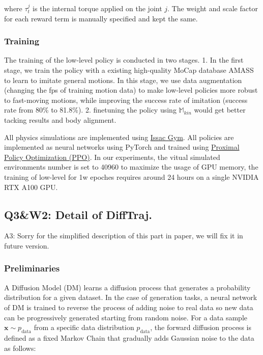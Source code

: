 \documentclass{article}
\begin{document}
where $\tau_t^{j}$ is the internal torque applied on the joint $j$. The weight and scale factor for each reward term is manually specified and kept the same.

\subsubsection{Training}\label{training}

The training of the low-level policy is conducted in two stages. 1. In the first stage, we train the policy with a existing high-quality MoCap database AMASS to learn to imitate general motions. In this stage, we use data augmentation (changing the fps of training motion data) to make low-level policies more robust to fast-moving motions, while improving the success rate of imitation (success rate from 80\% to 81.8\%). 2. finetuning the policy using $\mathbb{M}_{kin}$ would get better tacking results and body alignment.

All physics simulations are implemented using \href{https://developer.nvidia.com/isaac-gym}{Issac Gym}. All policies are implemented as neural networks using PyTorch and trained using \href{https://arxiv.org/pdf/1707.06347}{Proximal Policy Optimization (PPO)}. In our experiments, the vitual simulated environments number is set to 40960 to maximize the usage of GPU memory, the training of low-level for 1w epoches requires around 24 hours on a single NVIDIA RTX A100 GPU.

\subsection{Q3\&W2: Detail of DiffTraj.}\label{q3w2-detail-of-difftraj.}

A3: Sorry for the simplified description of this part in paper, we will fix it in future version.

\subsubsection{Preliminaries}\label{preliminaries}

A Diffusion Model (DM) learns a diffusion process that generates a probability distribution for a given dataset. In the case of generation tasks, a neural network of DM is trained to reverse the process of adding noise to real data so new data can be progressively generated starting from random noise. For a data sample $\mathbf{x} \sim p_{\text{data}}$ from a specific data distribution $p_{\text{data}}$, the forward diffusion process is defined as a fixed Markov Chain that gradually adds Gaussian noise to the data as follows:
\end{document}

